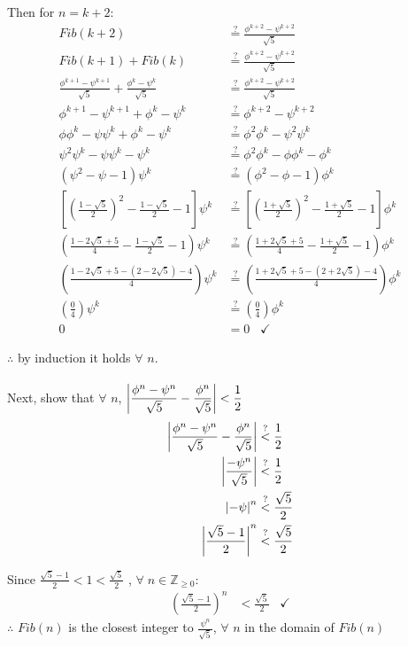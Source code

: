 \documentclass{report}
\DeclarePairedDelimiter\abs{\lvert}{\rvert}%
\newcommand{\?}{\stackrel{?}{=}}
\newcommand{\<}{\stackrel{?}{<}}
\begin{document}
Then for $n = k + 2$:
\begin{align}
Fib(k + 2) &\? \frac{\phi^{k + 2} - \psi^{k + 2}}{\sqrt{5}}\\
Fib(k + 1) + Fib(k) &\? \frac{\phi^{k + 2} - \psi^{k + 2}}{\sqrt{5}}\\
\frac{\phi^{k + 1} - \psi^{k + 1}}{\sqrt{5}} + \frac{\phi^k - \psi^k}{\sqrt{5}} &\? \frac{\phi^{k + 2} - \psi^{k + 2}}{\sqrt{5}}\\
\phi^{k + 1} - \psi^{k + 1} + \phi^k - \psi^k &\? \phi^{k + 2} - \psi^{k + 2}\\
\phi\phi^k - \psi\psi^k + \phi^k - \psi^k &\? \phi^2\phi^k - \psi^2\psi^k\\
\psi^2\psi^k - \psi\psi^k - \psi^k &\? \phi^2\phi^k -\phi\phi^k - \phi^k\\
(\psi^2 - \psi - 1)\psi^k &\? (\phi^2 - \phi - 1)\phi^k\\
\left[\left(\frac{1 - \sqrt{5}}{2}\right)^2 - \frac{1 - \sqrt{5}}{2} - 1\right]\psi^k &\? \left[\left(\frac{1 + \sqrt{5}}{2}\right)^2 - \frac{1 + \sqrt{5}}{2} - 1\right]\phi^k\\
\left(\frac{1 - 2\sqrt{5} + 5}{4} - \frac{1 - \sqrt{5}}{2} - 1\right)\psi^k &\? \left(\frac{1 + 2\sqrt{5} + 5}{4} - \frac{1 + \sqrt{5}}{2} - 1\right)\phi^k\\
\left(\frac{1 - 2\sqrt{5} + 5 - (2 - 2\sqrt{5}) - 4}{4}\right)\psi^k &\? \left(\frac{1 + 2\sqrt{5} + 5 - (2 + 2\sqrt{5}) - 4}{4}\right)\phi^k\\
\left(\frac{0}{4}\right)\psi^k &\? \left(\frac{0}{4}\right)\phi^k\\
0 &= 0 \;\;\; \checkmark
\end{align}

$\therefore$ by induction it holds $\forall$ $n$.\\
\\
Next, show that $\forall$ $n$, $\displaystyle \abs*{\frac{\phi^n - \psi^n}{\sqrt{5}} - \frac{\phi^n}{\sqrt{5}}} < \frac{1}{2}$\\

\begin{align}
\abs*{\frac{\phi^n - \psi^n}{\sqrt{5}} - \frac{\phi^n}{\sqrt{5}}} &\< \frac{1}{2}\\
\abs*{\frac{ -\psi^n}{\sqrt{5}}} &\< \frac{1}{2}\\
\abs*{-\psi}^n &\< \frac{\sqrt{5}}{2}\\
\abs*{\frac{\sqrt{5} - 1}{2}}^n &\< \frac{\sqrt{5}}{2}\\
\end{align}

Since $\displaystyle \frac{\sqrt{5} - 1}{2} < 1 < \frac{\sqrt{5}}{2}$ ,  $\forall \; n \in \mathbb{Z}_{\geq0}$:\\
\begin{align}
\left(\frac{\sqrt{5} - 1}{2}\right)^n &< \frac{\sqrt{5}}{2}  \;\;\; \checkmark
\end{align}
$\therefore$ $Fib(n)$ is the closest integer to $\displaystyle \frac{\psi^n}{ \sqrt{5}}$, $\forall$ $n$ in the domain of $Fib(n)$
\end{document}
